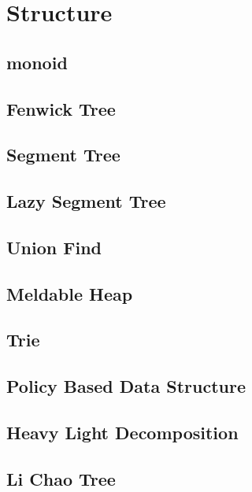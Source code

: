 \section{Structure}

\subsection{monoid}


\subsection{Fenwick Tree}


\subsection{Segment Tree}


\subsection{Lazy Segment Tree}





\subsection{Union Find}


\subsection{Meldable Heap}


\subsection{Trie}


\subsection{Policy Based Data Structure}


\subsection{Heavy Light Decomposition}


\subsection{Li Chao Tree}


